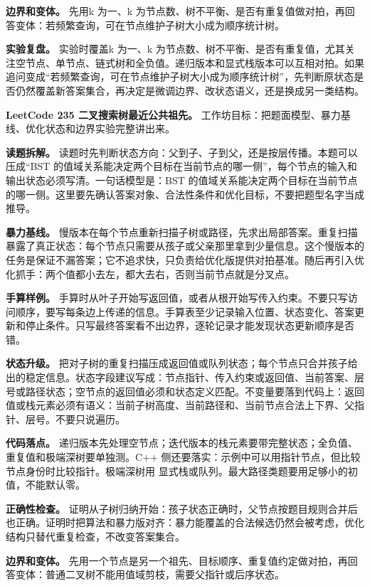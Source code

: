 \textbf{边界和变体。} 先用k 为一、k 为节点数、树不平衡、是否有重复值做对拍，再回答变体：若频繁查询，可在节点维护子树大小成为顺序统计树。

\textbf{实验复盘。} 实验时覆盖k 为一、k 为节点数、树不平衡、是否有重复值，尤其关注空节点、单节点、链式树和全负值。递归版本和显式栈版本可以互相对拍。如果追问变成“若频繁查询，可在节点维护子树大小成为顺序统计树”，先判断原状态是否仍然覆盖新答案集合，再决定是微调边界、改状态语义，还是换成另一类结构。

\noindent\textbf{LeetCode 235 二叉搜索树最近公共祖先。} 工作坊目标：把题面模型、暴力基线、优化状态和边界实验完整讲出来。

\textbf{读题拆解。} 读题时先判断状态方向：父到子、子到父，还是按层传播。本题可以压成“BST 的值域关系能决定两个目标在当前节点的哪一侧”，每个节点的输入和输出状态必须写清。一句话模型是：BST 的值域关系能决定两个目标在当前节点的哪一侧。这里要先确认答案对象、合法性条件和优化目标，不要把题型名字当成推导。

\textbf{暴力基线。} 慢版本在每个节点重新扫描子树或路径，先求出局部答案。重复扫描暴露了真正状态：每个节点只需要从孩子或父亲那里拿到少量信息。这个慢版本的任务是保证不漏答案；它不追求快，只负责给优化版提供对拍基准。随后再引入优化抓手：两个值都小去左，都大去右，否则当前节点就是分叉点。

\textbf{手算样例。} 手算时从叶子开始写返回值，或者从根开始写传入约束。不要只写访问顺序，要写每条边上传递的信息。手算表至少记录输入位置、状态变化、答案更新和停止条件。只写最终答案看不出边界，逐轮记录才能发现状态更新顺序是否错。

\textbf{状态升级。} 把对子树的重复扫描压成返回值或队列状态；每个节点只合并孩子给出的稳定信息。状态字段建议写成：节点指针、传入约束或返回值、当前答案、层号或路径状态；空节点的返回值必须和状态定义匹配。不变量要落到代码上：返回值或栈元素必须有语义：当前子树高度、当前路径和、当前节点合法上下界、父指针、层号。不要只说遍历。

\textbf{代码落点。} 递归版本先处理空节点；迭代版本的栈元素要带完整状态；全负值、重复值和极端深树要单独测。C++ 侧还要落实：示例中可以用指针节点，但比较节点身份时比较指针。极端深树用  显式栈或队列。最大路径类题要用足够小的初值，不能默认零。

\textbf{正确性检查。} 证明从子树归纳开始：孩子状态正确时，父节点按题目规则合并后也正确。证明时把算法和暴力版对齐：暴力能覆盖的合法候选仍然会被考虑，优化结构只替代重复检查，不改变答案集合。

\textbf{边界和变体。} 先用一个节点是另一个祖先、目标顺序、重复值约定做对拍，再回答变体：普通二叉树不能用值域剪枝，需要父指针或后序状态。


